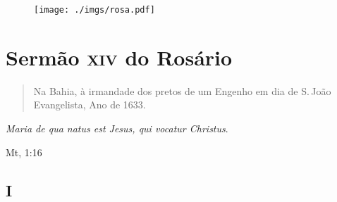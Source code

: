 \pagebreak
\thispagestyle{empty}
\movetoevenpage
\begin{figure}
\texttt{[image: ./imgs/rosa.pdf]}  
\end{figure}

\chapter{Sermão \textsc{xiv} do Rosário}

\begin{quotation}
\noindent{}Na Bahia, à irmandade dos pretos de um Engenho
em dia de S.\,João Evangelista, Ano de 1633.
\end{quotation}

\epigraph{\emph{Maria de qua natus est Jesus, qui vocatur Christus}.}{Mt, 1:16\footnotemark}

\section{I}

